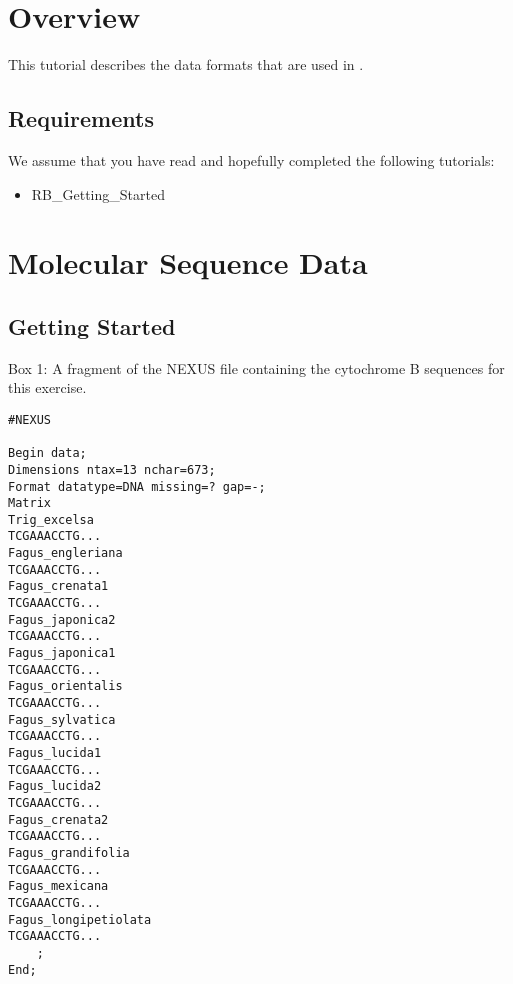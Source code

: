 \section{Overview}


This tutorial describes the data formats that are used in \RevBayes.


\subsection*{Requirements}
We assume that you have read and hopefully completed the following tutorials:
\begin{itemize}
\item RB\_Getting\_Started
\end{itemize}



\section{Molecular Sequence Data}

\bigskip
\subsection{Getting Started}




\begin{center}
Box 1: A fragment of the NEXUS file containing the cytochrome B sequences for this exercise. \\
\end{center}
{\tt \scriptsize \begin{framed}
\begin{lstlisting}
#NEXUS 

Begin data;
Dimensions ntax=13 nchar=673;
Format datatype=DNA missing=? gap=-;
Matrix
Trig_excelsa   
TCGAAACCTG...
Fagus_engleriana   
TCGAAACCTG...
Fagus_crenata1   
TCGAAACCTG...
Fagus_japonica2   
TCGAAACCTG...
Fagus_japonica1   
TCGAAACCTG...
Fagus_orientalis   
TCGAAACCTG...
Fagus_sylvatica   
TCGAAACCTG...
Fagus_lucida1   
TCGAAACCTG...
Fagus_lucida2   
TCGAAACCTG...
Fagus_crenata2   
TCGAAACCTG...
Fagus_grandifolia   
TCGAAACCTG...
Fagus_mexicana   
TCGAAACCTG...
Fagus_longipetiolata   
TCGAAACCTG...
	;
End;
\end{lstlisting}
\end{framed}}


